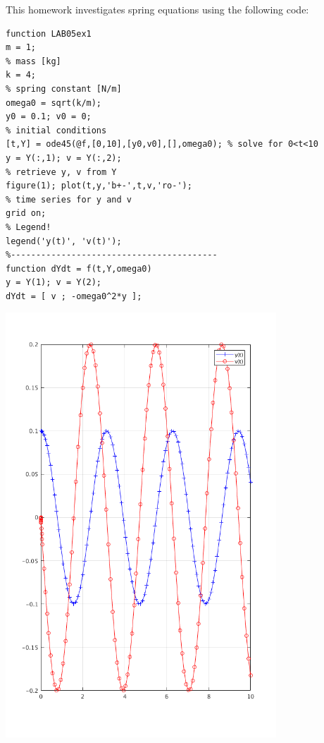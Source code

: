 
This homework investigates spring equations using the following code:
\begin{verbatim}
function LAB05ex1
m = 1;
% mass [kg]
k = 4;
% spring constant [N/m]
omega0 = sqrt(k/m);
y0 = 0.1; v0 = 0;
% initial conditions
[t,Y] = ode45(@f,[0,10],[y0,v0],[],omega0); % solve for 0<t<10
y = Y(:,1); v = Y(:,2);
% retrieve y, v from Y
figure(1); plot(t,y,'b+-',t,v,'ro-');
% time series for y and v
grid on;
% Legend!
legend('y(t)', 'v(t)');
%-----------------------------------------
function dYdt = f(t,Y,omega0)
y = Y(1); v = Y(2);
dYdt = [ v ; -omega0^2*y ];
\end{verbatim}

\includegraphics[width=4in, scale=0.4]{0.png}

